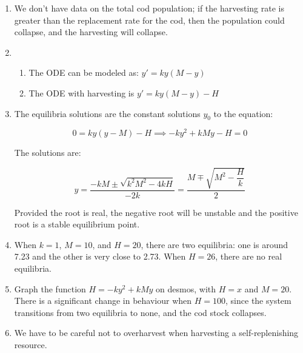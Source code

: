 \begin{enumerate}
\begin{enumerate}
    \item We don't have data on the total cod population; if the harvesting rate is greater than the replacement rate for the cod, then the population could collapse, and the harvesting will collapse.

    \item \begin{enumerate}
        \item The ODE can be modeled as: $y' = ky(M-y)$
        \item The ODE with harvesting is $y' = ky(M-y)- H$ 
    \end{enumerate}
    \item The equilibria solutions are the constant solutions $y_0$ to the equation:

    \[0=ky(y-M)-H \implies -ky^2+kMy -H = 0\]

    The solutions are:

    \[y = \frac{-kM \pm \sqrt{k^2M^2 -4kH}}{-2k} =\frac{M \mp \sqrt{M^2 - \dfrac{H}{k}}}{2}\]

    Provided the root is real, the negative root will be unstable and the positive root is a stable equilibrium point.

    \item When $k=1$, $M=10$, and $H=20$, there are two equilibria: one is around 7.23 and the other is very close to 2.73. When $H=26$, there are no real equilibria.

    \item Graph the function $H= -ky^2 +kMy$ on desmos, with $H=x$ and $M=20$. There is a significant change in behaviour when $H=100$, since the system transitions from two equilibria to none, and the cod stock collapses.

    \item We have to be careful not to overharvest when harvesting a self-replenishing resource.
\end{enumerate}
\end{enumerate}